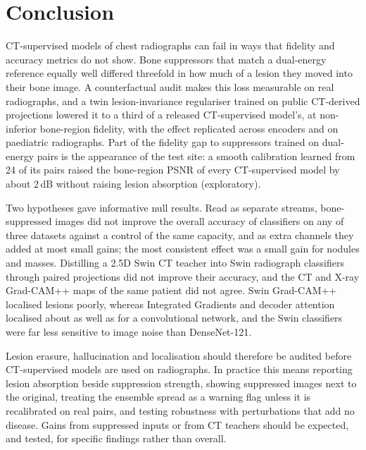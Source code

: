 \section{Conclusion}
\label{sec:conclusion}
CT-supervised models of chest radiographs can fail in ways that fidelity and accuracy metrics do not show. Bone suppressors that match a
dual-energy reference equally well differed threefold in how much of a lesion they moved into their bone image. A counterfactual audit makes
this loss measurable on real radiographs, and a twin lesion-invariance regulariser trained on public CT-derived projections lowered it to a
third of a released CT-supervised model's, at non-inferior bone-region fidelity, with the effect replicated across encoders and on
paediatric radiographs. Part of the fidelity gap to suppressors trained on dual-energy pairs is the appearance of the test site: a smooth
calibration learned from 24 of its pairs raised the bone-region PSNR of every CT-supervised model by about 2\,dB without raising lesion
absorption (exploratory).

Two hypotheses gave informative null results. Read as separate streams, bone-suppressed images did not improve the overall accuracy of
classifiers on any of three datasets against a control of the same capacity, and as extra channels they added at most small gains; the most
consistent effect was a small gain for nodules and masses. Distilling a 2.5D Swin CT teacher into Swin radiograph classifiers through
paired projections did not improve their accuracy, and the CT and X-ray Grad-CAM++ maps of the same patient did not agree. Swin Grad-CAM++
localised lesions poorly, whereas Integrated Gradients and decoder attention localised about as well as for a convolutional network, and
the Swin classifiers were far less sensitive to image noise than DenseNet-121.

Lesion erasure, hallucination and localisation should therefore be audited before CT-supervised models are used on radiographs. In
practice this means reporting lesion absorption beside suppression strength, showing suppressed images next to the original, treating the
ensemble spread as a warning flag unless it is recalibrated on real pairs, and testing robustness with perturbations that add no disease.
Gains from suppressed inputs or from CT teachers should be expected, and tested, for specific findings rather than overall.
